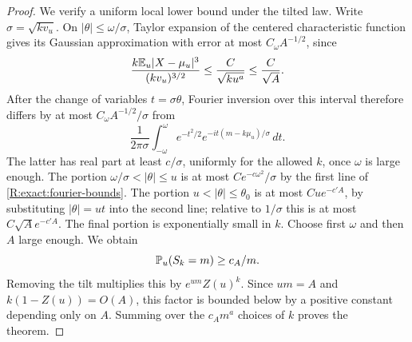 \begin{proof}
We verify a uniform local lower bound under the tilted law. Write $\sigma=\sqrt{kv_u}$. On $|\theta|\le\omega/\sigma$, Taylor expansion of the centered characteristic function gives its Gaussian approximation with error at most $C_\omega A^{-1/2}$, since
\[
 \frac{k\mathbb E_u|X-\mu_u|^3}{(kv_u)^{3/2}}
 \le \frac C{\sqrt{ku^a}}\le\frac C{\sqrt A}.
\]
After the change of variables $t=\sigma\theta$, Fourier inversion over this interval therefore differs by at most $C_\omega A^{-1/2}/\sigma$ from
\[
 \frac1{2\pi\sigma}\int_{-\omega}^{\omega}
 e^{-t^2/2}e^{-it(m-k\mu_u)/\sigma}\,dt.
\]
The latter has real part at least $c/\sigma$, uniformly for the allowed $k$, once $\omega$ is large enough. The portion $\omega/\sigma<|\theta|\le u$ is at most $C e^{-c\omega^2}/\sigma$ by the first line of \eqref{R:exact:fourier-bounds}. The portion $u<|\theta|\le\theta_0$ is at most $Cu e^{-c'A}$, by substituting $|\theta|=u t$ into the second line; relative to $1/\sigma$ this is at most $C\sqrt A e^{-c'A}$. The final portion is exponentially small in $k$. Choose first $\omega$ and then $A$ large enough. We obtain
\[
 \mathbb P_u(S_k=m)\ge c_A/m.
\]
Removing the tilt multiplies this by $e^{um}Z(u)^k$. Since $um=A$ and $k(1-Z(u))=O(A)$, this factor is bounded below by a positive constant depending only on $A$. Summing over the $c_A m^a$ choices of $k$ proves the theorem.
\end{proof}

